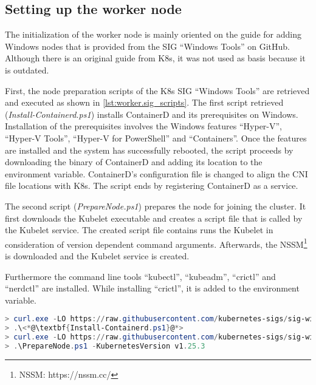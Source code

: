 \subsection{Setting up the worker node}
The initialization of the worker node is mainly oriented on the guide for adding \ac{Windows} nodes that is provided from the \ac{SIG} \enquote{Windows Tools} on GitHub\cite{GitHubKubernetesSIGWindowsTools.20230213}. Although there is an original guide from \ac{K8s}\cite{Kubernetes.20220419}, it was not used as basis because it is outdated.

First, the node preparation scripts of the \ac{K8s} \ac{SIG} \enquote{Windows Tools} are retrieved and executed as shown in \autoref{lst:worker.sig_scripts}. The first script retrieved (\textit{Install-Containerd.ps1}) installs ContainerD and its prerequisites on \ac{Windows}. Installation of the prerequisites involves the Windows features \enquote{Hyper-V}, \enquote{Hyper-V Tools}, \enquote{Hyper-V for PowerShell} and \enquote{Containers}. Once the features are installed and the system has successfully rebooted, the script proceeds by downloading the binary of ContainerD and adding its location to the  environment variable. ContainerD's configuration file is changed to align the \ac{CNI} file locations with \ac{K8s}. The script ends by registering ContainerD as a service.

The second script (\textit{PrepareNode.ps1}) prepares the node for joining the cluster. It first downloads the Kubelet executable and creates a script file that is called by the Kubelet service. The created script file contains runs the Kubelet in consideration of version dependent command arguments. Afterwards, the \ac{NSSM}\footnote{NSSM: https://nssm.cc/} is downloaded and the Kubelet service is created.

Furthermore the command line tools \enquote{kubectl}, \enquote{kubeadm}, \enquote{crictl} and \enquote{nerdctl} are installed. While installing \enquote{crictl}, it is added to the  environment variable.

\begin{lstlisting}[label=lst:worker.sig_scripts, caption={Retrieval of node preparation scripts\cite{GitHubKubernetesSIGWindowsTools.20230213}}, language=PowerShell, morekeywords={curl.exe, Install-Containerd.ps1, PrepareNode.ps1}]
> curl.exe -LO https://raw.githubusercontent.com/kubernetes-sigs/sig-windows-tools/master/kubeadm/scripts/Install-Containerd.ps1
> .\<*@\textbf{Install-Containerd.ps1}@*>
> curl.exe -LO https://raw.githubusercontent.com/kubernetes-sigs/sig-windows-tools/master/kubeadm/scripts/Prepare<*@\kern.7pt@*>Node.ps1
> .\PrepareNode.ps1 -KubernetesVersion v1.25.3
\end{lstlisting}

